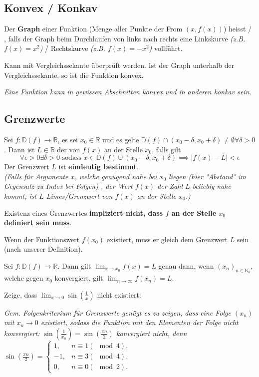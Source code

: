\subsection{Konvex / Konkav}
Der \textbf{Graph} einer Funktion (Menge aller Punkte der From $(x, f(x))$) heisst  / , falls der Graph beim Durchlaufen von links nach rechts eine Linkskurve \textit{(z.B. $f(x)=x^2$)} / Rechtskurve \textit{(z.B. $f(x)=-x^2$)} vollführt.

Kann mit Vergleichssekante überprüft werden. Ist der Graph unterhalb der Vergleichssekante, so ist die Funktion konvex. 

\textit{Eine Funktion kann in gewissen Abschnitten konvex und in anderen konkav sein.}

\subsection{Grenzwerte}

Sei $f : \mathbb{D}(f) \rightarrow \mathbb{R}$, es sei $x_0 \in \mathbb{R}$ und es gelte $\mathbb{D}(f) \cap (x_0 - \delta, x_0 + \delta) \neq \emptyset \forall \delta > 0$.
Dann ist $L \in \mathbb{R}$ der  von $f(x)$ an der Stelle $x_0$, falls gilt 
$$\forall \epsilon > 0 \exists \delta >0 \text{ sodass }x \in \mathbb{D}(f) \cup (x_0 - \delta, x_0 + \delta) \implies |f(x) - L | < \epsilon$$
Der Grenzwert $L$ ist \textbf{eindeutig bestimmt}.\\
\textit{(Falls für Argumente $x$, welche genügend nahe bei $x_0$ liegen (hier "Abstand" im Gegensatz zu Index bei Folgen) , der Wert $f(x)$ der Zahl $L$ beliebig nahe kommt, ist $L$ Limes/Grenzwert von $f(x)$ an der Stelle $x_0$.)}

Existenz eines Grenzwertes \textbf{impliziert nicht, dass $f$ an der Stelle $x_0$ definiert sein muss}.

Wenn der Funktionswert $f(x_0)$ existiert, muss er gleich dem Grenzwert $L$ sein (nach unserer Definition).

Sei $f: \mathbb{D}(f) \rightarrow \mathbb{R}$. Dann gilt $\lim_{x \rightarrow x_0} f(x)= L$ genau dann, wenn  $(x_n)_{n \in \mathbb{N}_0}$, welche gegen $x_0$ konvergiert, gilt $\lim_{n \rightarrow \infty} f(x_n) = L$.

\begin{exercise}
    Zeige, dass $\lim_{x \rightarrow 0}\sin(\frac{1}{x})$ nicht existiert:

    \textit{Gem. Folgenkriterium für Grenzwerte genügt es zu zeigen, dass eine Folge $(x_n)$ mit $x_n \rightarrow 0$ existiert, sodass die Funktion mit den Elementen der Folge nicht konvergiert: $\sin(\frac{1}{x_n})=\sin(\frac{\pi n}{2})$ konvergiert nicht, denn $\sin(\frac{\pi n}{2}) = \begin{cases}
    1, &n \equiv 1 (\mod 4),\\
    -1, &n \equiv 3 (\mod 4),\\
    0, &n \equiv 0 (\mod 2).
    \end{cases}$}
\end{exercise}

